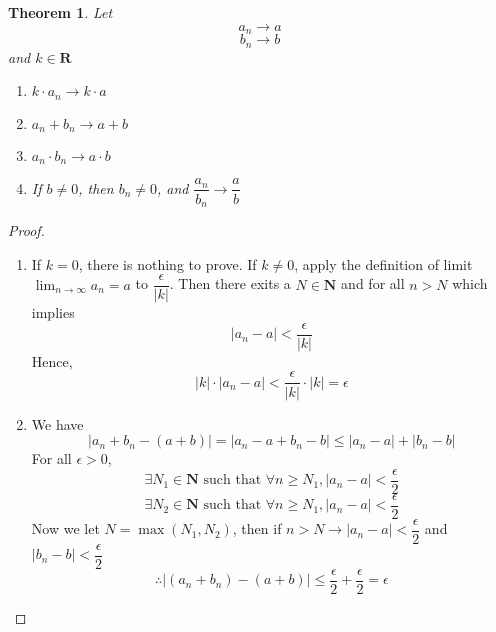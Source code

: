 \documentclass[10pt,letterpaper]{article}
\newtheorem{thm}{Theorem}
\begin{document}
	\begin{thm}
		Let 
			$$a_n \rightarrow a$$
			$$b_n \rightarrow b$$
		and $k \in \mathbf{R}$
		\begin{enumerate}
		\item $k \cdot a_n \rightarrow k \cdot a$
		\item $a_n + b_n \rightarrow a + b$ 
		\item $a_n \cdot b_n \rightarrow a \cdot b$ 
		\item If $b \neq 0$, then $b_n \neq 0$, and $\dfrac{a_n}{b_n} \rightarrow \dfrac{a}{b}$
		\end{enumerate}
	\end{thm}
	\begin{proof}
		\begin{enumerate}
			\item If $k = 0$, there is nothing to prove. If $k \neq 0$, apply the definition of limit
			$\displaystyle\lim_{n\to\infty}a_n = a$ to $\dfrac{\epsilon}{|k|}$. Then there exits
			a $N \in \mathbf{N}$ and for all $n > N$ which implies
			$$|a_n - a| < \dfrac{\epsilon}{|k|}$$
			Hence,
			$$|k| \cdot |a_n - a| < \dfrac{\epsilon}{|k|} \cdot |k| = \epsilon$$
			
			\item We have
			$$|a_n + b_n - (a + b)| = |a_n - a + b_n - b| \leq |a_n - a| + |b_n - b|$$
			For all $\epsilon > 0$,
			$$\exists N_1 \in \mathbf{N} \text{ such that } \forall n \geq N_1,  |a_n - a| < \dfrac{\epsilon}{2}$$
			$$\exists N_2 \in \mathbf{N} \text{ such that } \forall n \geq N_1,  |a_n - a| < \dfrac{\epsilon}{2}$$  
			Now we let $N = \max(N_1, N_2)$, then if $n > N \rightarrow |a_n - a| < \dfrac{\epsilon}{2}$ and 
			$|b_n - b| < \dfrac{\epsilon}{2}$
			$$\therefore |(a_n + b_n) - (a + b)| \leq \dfrac{\epsilon}{2} + \dfrac{\epsilon}{2} = \epsilon$$  		
		\end{enumerate}
	\end{proof}
	
\end{document}
